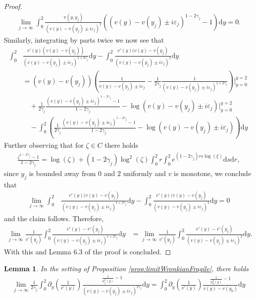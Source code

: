 \documentclass[11pt,reqno]{amsproc}
\newtheorem{lemma}[proposition]{Lemma}
\theoremstyle{definition}
\numberwithin{equation}{section}
\renewcommand{\d}{\mathrm{d}}
\newcommand{\ep}{\varepsilon}
\begin{document}
\begin{proof}
\begin{align*}
\lim_{j\rightarrow \infty} \int_0^2 \frac{\mathrm{v}(y,y_j)}{(v(y) - v(y_j) \pm i\ep_j)^2} \left( (v(y) - v(y_j) \pm i\ep_j)^{1-2\gamma_j} -1 \right) \d y = 0.
\end{align*}
Similarly, integrating by parts twice we now see that
\begin{align*}
\int_0^2 &\frac{v'(y)(v(y) - v(y_j))}{(v(y) - v(y_j)\pm i\ep_j)^{1+2\gamma_j}} \d y - \int_0^2 \frac{v'(y)(v(y) - v(y_j)}{(v(y) - v(y_j)\pm i\ep_j)^2} \d y \\
&=  (v(y) - v(y_j)) \left( \frac{1}{v(y)-v(y_j) \pm i\ep_j} - \frac{1}{2\gamma_j}\frac{1}{(v(y) - v(y_j) \pm i\ep_j)^{1+2\gamma_j}} \right) \Big|_{y=0}^{y=2} \\
&\quad + \frac{1}{2\gamma_j}\frac{(v(y) - v(y_j)\pm i\ep_j)^{1-2\gamma_j}-1}{1-2\gamma_j} - \log(v(y) - v(y_j) \pm i\ep_j) \Big|_{y=0}^{y=2} \\
&\quad - \int_0^2 \left( \frac{1}{2\gamma_j}\frac{(v(y) - v(y_j)\pm i\ep_j)^{1-2\gamma_j}-1}{1-2\gamma_j} - \log(v(y) - v(y_j) \pm i\ep_j) \right) \d y
\end{align*}
Further observing that for $\zeta\in C$ there holds
\begin{align*}
\frac{\zeta^{1-2\gamma_j}-1}{1-2\gamma_j} = \log(\zeta) + (1-2\gamma_j)\log^2(\zeta)\int_0^2r\int_0^2 e^{(1-2\gamma_j)r s \log(\xi)} \d s \d r, 
\end{align*}
since $y_j$ is bounded away from $0$ and $2$ uniformly and $v$ is monotone, we conclude that 
\begin{align*}
\lim_{j\rightarrow \infty} \int_0^2 &\frac{v'(y)(v(y) - v(y_j)}{(v(y) - v(y_j)\pm i\ep_j)^{1+2\gamma_j}} \d y - \int_0^2 \frac{v'(y)(v(y) - v(y_j)}{(v(y) - v(y_j)\pm i\ep_j)^2} \d y = 0
\end{align*}
and the claim follows. Therefore,
\begin{align*}
\lim_{j\rightarrow \infty} \frac{1}{v'(y_j)}\int_0^2 \frac{v'(y) - v'(y_j)}{(v(y) - v(y_j) \pm i\ep_j)^{1+2\gamma_j}} \d y &= \lim_{j\rightarrow \infty}\frac{1}{v'(y_j)}\int_0^2 \frac{v'(y) - v'(y_j)}{(v(y) - v(y_j) \pm i\ep_j)^{2}} \d y.
\end{align*}
With this and Lemma 6.3 of \cite{WZZ18} the proof is concluded.
\end{proof}



\begin{lemma}\label{lemma:firstconvergencelemma}
In the setting of Proposition \ref{prop:limitWronkianFragile}, there holds
\begin{align*}
\lim_{j\rightarrow \infty} \frac{1}{2\gamma_j}\int_0^2 \partial_y\left( \frac{1}{v'(y)} \right) \frac{  \frac{1}{\phi_j^2(y) } -1}{(v(y) - v(y_j) \pm i\ep_j)^{2\gamma_j}} \d y = \int_0^2 \partial_y\left( \frac{1}{v'(y)} \right) \frac{  \frac{1}{\phi_0^2(y) } -1}{v(y) - v(y_0)} \d y
\end{align*}
\end{lemma}
\end{document}
